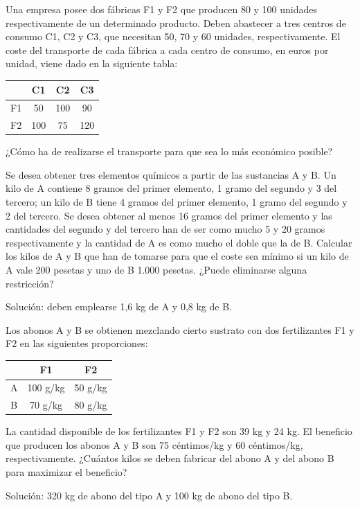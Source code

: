 \begin{Ejer}
Una empresa posee dos f\'abricas F1 y F2 que producen 80 y 100 unidades respectivamente de un determinado producto. Deben abastecer a tres centros de consumo C1, C2 y C3, que necesitan 50, 70 y 60 unidades, respectivamente. El coste del transporte de cada f\'abrica a cada centro de consumo, en euros por unidad, viene dado en la siguiente tabla:

\begin{center}
\begin{tabular}{c|ccc}
 & C1 & C2 & C3 \\
\hline
F1 & 50 & 100 & 90 \\
F2 & 100 & 75 & 120 \\
\end{tabular}
\end{center}

¿C\'omo ha de realizarse el transporte para que sea lo m\'as econ\'omico posible?
\end{Ejer}


\begin{Ejer}
Se desea obtener tres elementos qu\'imicos a partir de las sustancias A y B. Un kilo de A contiene 8 gramos del primer elemento, 1 gramo del segundo y 3 del tercero; un kilo de B tiene 4 gramos del primer elemento, 1 gramo del segundo y 2 del tercero. Se desea obtener al menos 16 gramos del primer elemento y las cantidades del segundo y del tercero han de ser como mucho 5 y 20 gramos respectivamente y la cantidad de A es como mucho el doble que la de B. Calcular los kilos de A y B que han de tomarse para que el coste sea m\'inimo si un kilo de A vale 200 pesetas y uno de B 1.000 pesetas. ¿Puede eliminarse alguna restricci\'on?

Soluci\'on: deben emplearse 1,6 kg de A y 0,8 kg de B.
\end{Ejer}

\begin{Ejer}
Los abonos A y B se obtienen mezclando cierto sustrato con dos fertilizantes F1 y F2 en las siguientes proporciones:

\begin{center}
\begin{tabular}{c|cc}
 & F1 & F2 \\
\hline
A & 100 g/kg & 50 g/kg \\
B & 70 g/kg & 80 g/kg \\
\end{tabular}
\end{center}

La cantidad disponible de los fertilizantes F1 y F2 son 39 kg y 24 kg. El beneficio que producen los abonos A y B son 75 c\'entimos/kg y 60 c\'entimos/kg, respectivamente. ¿Cu\'antos kilos se deben fabricar del abono A y del abono B para maximizar el beneficio?

Soluci\'on: 320 kg de abono del tipo A y 100 kg de abono del tipo B.
\end{Ejer}


